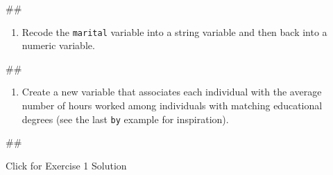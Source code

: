 \documentclass[
]{book}
\newenvironment{Shaded}{\begin{snugshade}}{\end{snugshade}}
\newcommand{\NormalTok}[1]{#1}
\providecommand{\tightlist}{%
  \setlength{\itemsep}{0pt}\setlength{\parskip}{0pt}}
\begin{document}
\begin{Shaded}
\begin{Highlighting}[]
\NormalTok{\#\#}
\end{Highlighting}
\end{Shaded}

\begin{enumerate}
\def\labelenumi{\arabic{enumi}.}
\setcounter{enumi}{1}
\tightlist
\item
  Recode the \texttt{marital} variable into a string variable and then back into a numeric variable.
\end{enumerate}

\begin{Shaded}
\begin{Highlighting}[]
\NormalTok{\#\#}
\end{Highlighting}
\end{Shaded}

\begin{enumerate}
\def\labelenumi{\arabic{enumi}.}
\setcounter{enumi}{2}
\tightlist
\item
  Create a new variable that associates each individual with the average number of hours worked among individuals with matching educational degrees (see the last \texttt{by} example for inspiration).
\end{enumerate}

\begin{Shaded}
\begin{Highlighting}[]
\NormalTok{\#\#}
\end{Highlighting}
\end{Shaded}

{Click for Exercise 1 Solution}
\end{document}
